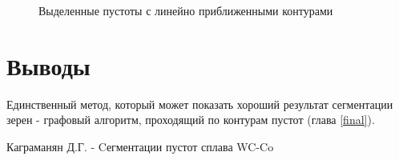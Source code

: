 \documentclass[a4paper, 14pt]{article}
\begin{document}
	 \begin{figure}[h]
			\caption{Выделенные пустоты с линейно приближенными контурами}
			\label{lines_resized}
		\end{figure}


\section{Выводы}

Единственный метод, который может показать хороший результат сегментации зерен - графовый алгоритм, проходящий по контурам пустот (глава \ref{final}).

\newpage
\begin{thebibliography}{}
	
	
	  Каграманян Д.Г. -  Cегментации пустот сплава WC-Co
	

		


\end{thebibliography}
	



	
\end{document}
